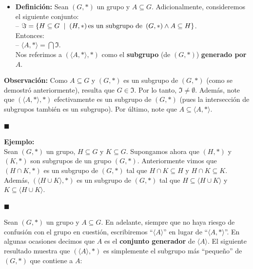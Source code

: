 \documentclass[10 pt]{article}
\begin{document}
\begin{itemize}
    \item \Large{\textbf{Definición:} Sean $(G,*)$ un grupo y $A \subseteq G$. Adicionalmente, consideremos el siguiente conjunto: \\

    -- $\Im=\{H \subseteq G \hspace{0.2 cm}|\hspace{0.2 cm} (H,*)\, \text{es un subgrupo de } \, (G,*) \land A \subseteq H\}$. \\

   Entonces: \\

   -- $\langle A,* \rangle= \bigcap \Im$. \\

   Nos referimos a $(\langle A,* \rangle,*)$ como el \textbf{subgrupo} (de $(G,*)$) \textbf{generado por $A$}.} \\
\end{itemize}

\Large{\textbf{Observación:} Como $A \subseteq G$ y $(G,*)$ es un subgrupo de $(G,*)$ (como se demostró anteriormente), resulta que $G \in \Im$. Por lo tanto, $\Im \neq \emptyset$. Además, note que $(\langle A,* \rangle,*)$ efectivamente es un subgrupo de $(G,*)$ (pues la intersección de subgrupos también es un subgrupo). Por último, note que $A \subseteq \langle A,* \rangle$.} \\

\begin{flushright}
    $\blacksquare$
\end{flushright}

\Large{\textbf{Ejemplo:}} \\

\Large{Sean $(G,*)$ un grupo, $H \subseteq G$ y $K \subseteq G$. Supongamos ahora que $(H,*)$ y $(K,*)$ son subgrupos de un grupo $(G,*)$. Anteriormente vimos que $(H \cap K,*)$ es un subgrupo de $(G,*)$ tal que $H \cap K \subseteq H$ y $H \cap K \subseteq K$. Además, $(\langle H \cup K \rangle,*)$ es un subgrupo de $(G,*)$ tal que $H \subseteq \langle H \cup K\rangle$ y $K \subseteq \langle H \cup K \rangle$.} \\

\begin{flushright}
    $\blacksquare$
\end{flushright}

\Large{Sean $(G,*)$ un grupo y $A \subseteq G$.  En adelante, siempre que no haya riesgo de confusión con el grupo en cuestión, escribiremos ``$\langle A \rangle$'' en lugar de ``$\langle A,*\rangle$''. En algunas ocasiones decimos que $A$ es el \textbf{conjunto generador} de $\langle A \rangle$. El siguiente resultado muestra que $(\langle A \rangle,*)$ es simplemente el subgrupo más ``pequeño'' de $(G,*)$ que contiene a $A$:} \\
\end{document}
